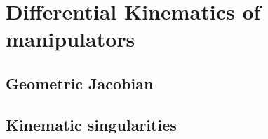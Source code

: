 \chapter{Differential Kinematics of manipulators}

\section{Geometric Jacobian}

\section{Kinematic singularities}